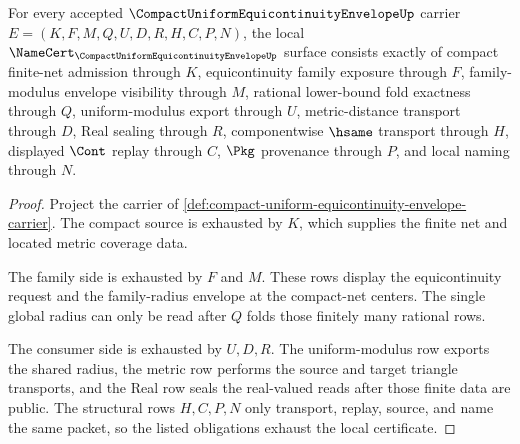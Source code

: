 \begin{theorem}
\label{thm:compact-uniform-equicontinuity-envelope-namecert-obligations}
For every accepted $\CompactUniformEquicontinuityEnvelopeUp$ carrier $E=(K,F,M,Q,U,D,R,H,C,P,N)$, the local $\NameCert_{\CompactUniformEquicontinuityEnvelopeUp}$ surface consists exactly of compact finite-net admission through $K$, equicontinuity family exposure through $F$, family-modulus envelope visibility through $M$, rational lower-bound fold exactness through $Q$, uniform-modulus export through $U$, metric-distance transport through $D$, Real sealing through $R$, componentwise $\hsame$ transport through $H$, displayed $\Cont$ replay through $C$, $\Pkg$ provenance through $P$, and local naming through $N$.
\end{theorem}
\begin{proof}
Project the carrier of \autoref{def:compact-uniform-equicontinuity-envelope-carrier}. The compact source is exhausted by $K$, which supplies the finite net and located metric coverage data.

The family side is exhausted by $F$ and $M$. These rows display the equicontinuity request and the family-radius envelope at the compact-net centers. The single global radius can only be read after $Q$ folds those finitely many rational rows.

The consumer side is exhausted by $U,D,R$. The uniform-modulus row exports the shared radius, the metric row performs the source and target triangle transports, and the Real row seals the real-valued reads after those finite data are public. The structural rows $H,C,P,N$ only transport, replay, source, and name the same packet, so the listed obligations exhaust the local certificate.
\end{proof}

